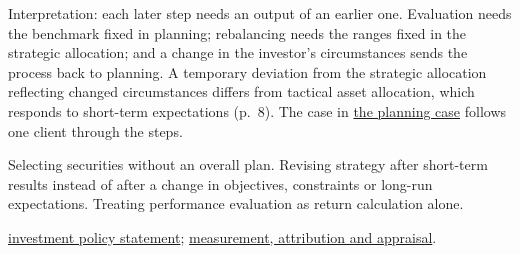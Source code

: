 \begin{qfdefinition}
 Interpretation: each later step needs an output of an earlier one. Evaluation needs the benchmark fixed in planning; rebalancing needs the ranges fixed in the strategic allocation; and a change in the investor's circumstances sends the process back to planning. A temporary deviation from the strategic allocation reflecting changed circumstances differs from tactical asset allocation, which responds to short-term expectations (p.~8). The case in \hyperref[ex:investment-planning-case]{the planning case} follows one client through the steps.

 Selecting securities without an overall plan. Revising strategy after short-term results instead of after a change in objectives, constraints or long-run expectations. Treating performance evaluation as return calculation alone.

 \hyperref[meth:investment-policy-statement]{investment policy statement}; \hyperref[def:performance-evaluation-components]{measurement, attribution and appraisal}.

\end{qfdefinition}

